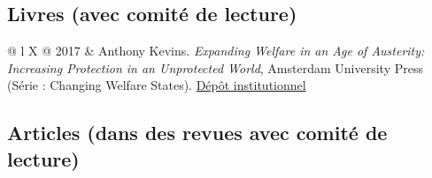 \documentclass[letterpaper,fontsize=10.5pt]{scrartcl}
\begin{document}
\subsection{Livres (avec comité de lecture)}
\vspace{-2em}
\begin{longtblr}[entry=none,label=none]{@{} l X @{}}
	2017 & Anthony Kevins. \textit{Expanding Welfare in an Age of Austerity: Increasing Protection in an Unprotected World}, Amsterdam University Press (Série : Changing Welfare States). \href{https://repository.lboro.ac.uk/articles/book/Expanding_welfare_in_an_age_of_austerity_Increasing_protection_in_an_unprotected_world/9994709}{Dépôt institutionnel} \\ 
\end{longtblr}

\subsection{Articles (dans des revues avec comité de lecture)}
\vspace{-2em}
\end{document}
